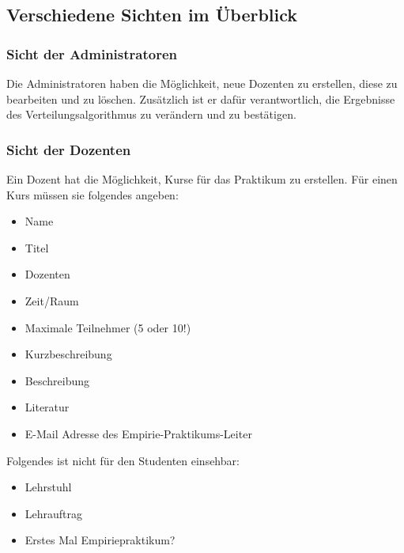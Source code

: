         
                
    \subsection{Verschiedene Sichten im Überblick}
    \label{Sichten}
                
        \subsubsection{Sicht der Administratoren}
            Die Administratoren haben die Möglichkeit, neue Dozenten zu erstellen, diese zu bearbeiten und zu löschen.
            Zusätzlich ist er dafür verantwortlich, die Ergebnisse des Verteilungsalgorithmus zu verändern und zu bestätigen.
                
  
         
        \subsubsection{Sicht der Dozenten}
            Ein Dozent hat die Möglichkeit, Kurse für das Praktikum zu erstellen. Für einen Kurs müssen sie folgendes angeben:
            \begin{itemize}
                \item Name
                \item Titel
                \item Dozenten
                \item Zeit/Raum
                \item Maximale Teilnehmer (5 oder 10!)
                \item Kurzbeschreibung
                \item Beschreibung
                \item Literatur
                \item E-Mail Adresse des Empirie-Praktikums-Leiter %
            \end{itemize}
            Folgendes ist nicht für den Studenten einsehbar:
            \begin{itemize}
                \item Lehrstuhl
                \item Lehrauftrag
                \item Erstes Mal Empiriepraktikum?
            \end{itemize}
            
